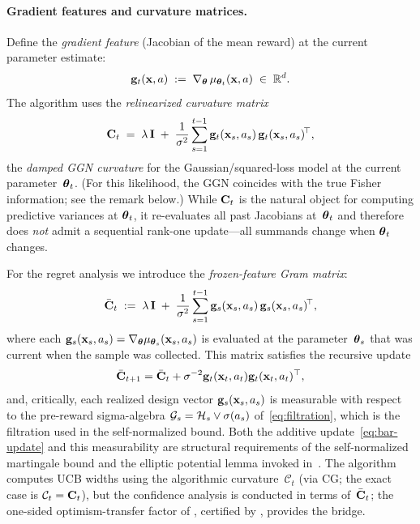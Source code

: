 \documentclass[twoside]{article}
\newcommand{\Calg}{\mathcal{C}}                 %
\newcommand{\cHist}{\mathcal{H}}                %
\begin{document}
\paragraph{Gradient features and curvature matrices.}
Define the \emph{gradient feature} (Jacobian of the mean reward) at the
current parameter estimate:
\begin{equation}\label{eq:gfeat}
  \mathbf{g}_t(\mathbf{x},a) \;:=\; \nabla_{\boldsymbol{\theta}}\,\mu_{\boldsymbol{\theta}_t}(\mathbf{x},a)
  \;\in\;\mathbb{R}^d.
\end{equation}
The algorithm uses the \emph{relinearized curvature matrix}
\begin{equation}\label{eq:curvature}
  \mathbf{C}_t
  \;=\;
  \lambda\,\mathbf{I}
  \;+\;
  \frac{1}{\sigma^2}\sum_{s=1}^{t-1}
    \mathbf{g}_t(\mathbf{x}_s,a_s)\,\mathbf{g}_t(\mathbf{x}_s,a_s)^{\!\top},
\end{equation}
the \emph{damped GGN curvature} for the Gaussian/squared-loss model
at the current parameter~$\boldsymbol{\theta}_t$.
(For this likelihood, the GGN coincides with the true Fisher
information; see the remark below.)
While $\mathbf{C}_t$ is the natural object for
computing predictive variances at $\boldsymbol{\theta}_t$, it
re-evaluates all past Jacobians at~$\boldsymbol{\theta}_t$ and therefore does
\emph{not} admit a sequential rank-one update---all summands change
when $\boldsymbol{\theta}_t$ changes.

For the regret analysis we introduce the
\emph{frozen-feature Gram matrix}:
\begin{equation}\label{eq:curvature-bar}
  \bar{\mathbf{C}}_t
  \;:=\;
  \lambda\,\mathbf{I}
  \;+\;
  \frac{1}{\sigma^2}\sum_{s=1}^{t-1}
    \mathbf{g}_s(\mathbf{x}_s,a_s)\,\mathbf{g}_s(\mathbf{x}_s,a_s)^{\!\top},
\end{equation}
where each $\mathbf{g}_s(\mathbf{x}_s,a_s)=\nabla_{\boldsymbol{\theta}}\mu_{\boldsymbol{\theta}_s}(\mathbf{x}_s,a_s)$
is evaluated at the parameter~$\boldsymbol{\theta}_s$ that was current when the sample
was collected.  This matrix satisfies the recursive update
\begin{equation}\label{eq:bar-update}
  \bar{\mathbf{C}}_{t+1}=\bar{\mathbf{C}}_t+\sigma^{-2}\mathbf{g}_t(\mathbf{x}_t,a_t)\mathbf{g}_t(\mathbf{x}_t,a_t)^\top,
\end{equation}
and, critically, each realized design vector
$\mathbf{g}_s(\mathbf{x}_s,a_s)$ is measurable with respect to the pre-reward
sigma-algebra $\cG_s=\cHist_s\vee\sigma(a_s)$ of~\eqref{eq:filtration},
which is the filtration used in the self-normalized bound.
Both the additive update~\eqref{eq:bar-update} and
this measurability are structural requirements of the
self-normalized martingale bound and the elliptic potential lemma invoked
in~.
The algorithm computes UCB widths using the algorithmic curvature~$\Calg_t$
(via CG; the exact case is $\Calg_t=\bC_t$), but the confidence analysis is
conducted in terms of~$\bar{\mathbf{C}}_t$; the one-sided optimism-transfer factor
of , certified by , provides the
bridge.
\end{document}
